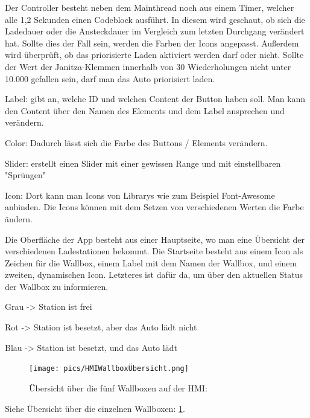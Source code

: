 \begin{compactitem}
  \item Der Controller besteht neben dem Mainthread noch aus einem Timer, welcher alle 1,2 Sekunden einen Codeblock ausführt. In diesem wird geschaut, ob sich die Ladedauer oder die Ansteckdauer im Vergleich zum letzten Durchgang verändert hat. Sollte dies der Fall sein, werden die Farben der Icons angepasst. Außerdem wird überprüft, ob das priorisierte Laden aktiviert werden darf oder nicht. Sollte der Wert der Janitza-Klemmen innerhalb von 30 Wiederholungen nicht unter 10.000 gefallen sein, darf man das Auto priorisiert laden. 
  \item Label: gibt an, welche ID und welchen Content der Button haben soll. Man kann den Content über den Namen des Elements und dem Label ansprechen und verändern.  
  \item Color: Dadurch lässt sich die Farbe des Buttons / Elements verändern.  
  \item Slider: erstellt einen Slider mit einer gewissen Range und mit einstellbaren "Sprüngen"  
  \item Icon: Dort kann man Icons von Librarys wie zum Beispiel Font-Awesome anbinden. Die Icons können mit dem Setzen von verschiedenen Werten die Farbe ändern.  
\end{compactitem}
Die Oberfläche der App besteht aus einer Hauptseite, wo man eine Übersicht der verschiedenen Ladestationen bekommt. Die Startseite besteht aus einem Icon als Zeichen für die Wallbox, einem Label mit dem Namen der Wallbox, und einem zweiten, dynamischen Icon. Letzteres ist dafür da, um über den aktuellen Status der Wallbox zu informieren.   

\begin{compactitem}
  \item Grau -> Station ist frei  
  \item Rot -> Station ist besetzt, aber das Auto lädt nicht  
  \item Blau -> Station ist besetzt, und das Auto lädt 
\end{compactitem}


\begin{figure}[h t]
  \centering
  \texttt{[image: pics/HMIWallboxÜbersicht.png]}
  \caption{Übersicht über die fünf Wallboxen auf der HMI: }
  \label{fig:impl:HMIWallboxÜbersicht}
\end{figure}

Siehe Übersicht über die einzelnen Wallboxen: \ref{fig:impl:HMIWallboxÜbersicht}.




